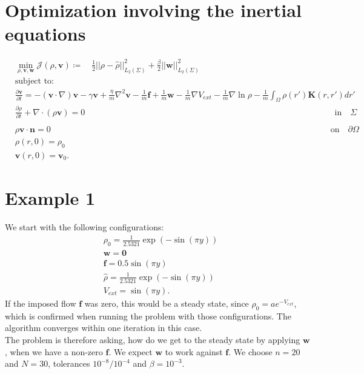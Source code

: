 \documentclass[11pt, a4paper]{article}
\theoremstyle{definition}
\newcommand{\w}{\mathbf{w}}
\newcommand{\Stav}{\mathbf{v}}
\newcommand{\Con}{\mathbf{f}}
\begin{document}
	\section*{Optimization involving the inertial equations}
	\begin{align*}
	&\min_{\rho,\Stav,\mathbf{w} } \mathcal J(\rho,\Stav) \coloneqq \quad \frac{1}{2}||\rho - \widehat \rho||_{L_2(\Sigma)}^2  +\frac{\beta}{2}||\mathbf{w}||_{L_2(\Sigma)}^2\\
	&\text{subject to:}\\
	& \frac{\partial \Stav}{\partial t}= -  (\Stav \cdot \nabla)\Stav - \gamma  \Stav + \frac{\eta}{m} \nabla^2 \Stav  -\frac{1}{m}\Con +\frac{1}{m}\mathbf{w} -\frac{1}{m} \nabla V_{ext} - \frac{1}{m}\nabla \ln \rho  -\frac{1}{m}\int_\Omega \rho(r') \mathbf{K}(r,r')dr' \\
	&\frac{\partial \rho}{\partial t} + \nabla \cdot (\rho \Stav)=0 \qquad\qquad \qquad\qquad\qquad\quad \quad\quad\qquad \qquad\qquad \qquad\qquad\qquad\quad \qquad\quad\ \ \text{in} \quad \Sigma\\
	\\
	&\rho \Stav \cdot \mathbf{n} =0\qquad\qquad \qquad\qquad\qquad\qquad\qquad\qquad\qquad \qquad\qquad \qquad\qquad\qquad \qquad\qquad\quad  \text{on} \quad \partial  \Omega\\
	& \rho(r,0)=\rho_0\\
	& \Stav(r,0)=\Stav_0.
	\end{align*}
	
	\section{Example 1}
	We start with the following configurations:
	\begin{align*}
	&\rho_0 = \frac{1}{2.5321}\exp(-\sin(\pi y))\\
	&\w = \mathbf{0}\\
	&\mathbf{f} = 0.5\sin(\pi y)\\
	&\widehat \rho = \frac{1}{2.5321}\exp(-\sin(\pi y))\\
	&V_{ext} =  \sin(\pi y).
	\end{align*}
	If the imposed flow $\mathbf{f}$ was zero, this would be a steady state, since $\rho_0 = a e^{-V_{ext}}$, which is confirmed when running the problem with those configurations. The algorithm converges within one iteration in this case.\\
	The problem is therefore asking, how do we get to the steady state by applying $\w$, when we have a non-zero $\mathbf f$. We expect $\w$ to work against $\mathbf{f}$.
	We choose $n = 20$ and $N = 30$, tolerances $10^{-8}/10^{-4}$ and $\beta = 10^{-3}$. 
	
\end{document}
